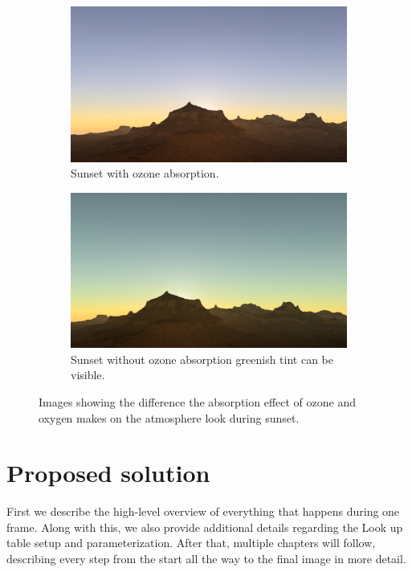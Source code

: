 \documentclass{ctuthesis}
\begin{document}
\hfill
\begin{figure}[h!]
     \centering
     \begin{subfigure}[b]{1.0\textwidth}
         \centering
         \includegraphics[width=\textwidth]{media/Sunset_with_ozone.png}
         \caption{Sunset with ozone absorption.}
         \label{fig:Sunset absorption}
     \end{subfigure}
     \quad
     \begin{subfigure}[b]{1.0\textwidth}
         \centering
         \includegraphics[width=\textwidth]{media/Sunset_without_ozone.png}
         \caption{Sunset without ozone absorption greenish tint can be visible.}
         \label{fig:Sunset no absorption}
     \end{subfigure}
        \caption[Ozone absorption effect]{Images showing the difference the absorption effect of ozone and oxygen makes on the atmosphere
        look during sunset.}
        \label{fig:ozone oxygen effect}
\end{figure}

\chapter{Proposed solution}
First we describe the high-level overview of everything that happens during one frame. Along with this, we also provide 
additional details regarding the Look up table setup and parameterization. After that, multiple chapters will follow,
describing every step from the start all the way to the final image in more detail.
\end{document}
